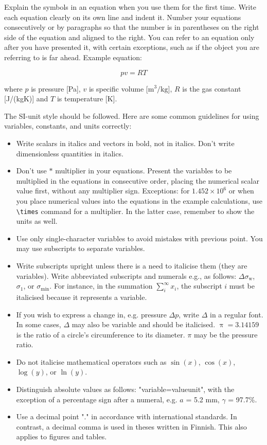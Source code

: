 Explain the symbols in an equation when you use them for the first time. Write each equation clearly on its own line and indent it. Number your equations consecutively or by paragraphs so that the number is in parentheses on the right side of the equation and aligned to the right. You can refer to an equation only after you have presented it, with certain exceptions, such as if the object you are referring to is far ahead. Example equation:

\begin{equation}
    pv=RT
\end{equation}

where $p$ is pressure [Pa], $v$ is specific volume [$\mathrm{m^3/kg}$], $R$ is the gas constant [J/(kgK)] and $T$ is temperature [K].

The SI-unit style should be followed. Here are some common guidelines for using variables, constants, and units correctly:
\begin{itemize}
    \item Write scalars in italics and vectors in bold, not in italics. Don’t write dimensionless quantities in italics.
    \item Don't use $*$ multiplier in your equations. Present the variables to be multiplied in the equations in consecutive order, placing the numerical scalar value first, without any multiplier sign. Exceptions: for $1.452\times10^6$ or when you place numerical values into the equations in the example calculations, use \verb|\times| command for a multiplier. In the latter case, remember to show the units as well.
    \item Use only single-character variables to avoid mistakes with previous point. You may use subscripts to separate variables.
    \item Write subscripts upright unless there is a need to italicise them (they are variables). Write abbreviated subscripts and numerals e.g., as follows: $\Delta\sigma_{\mathrm{w}}$, $\sigma_1$, or $\sigma_\mathrm{min}$. For instance, in the summation $\sum_i^\infty x_i$, the subscript $i$ must be italicised because it represents a variable.
    \item If you wish to express a change in, e.g. pressure $\Delta p$, write $\Delta$ in a regular font. In some cases, $\varDelta$ may also be variable and should be italicised. $\uppi = 3.14159$ is the ratio of a circle’s circumference to its diameter. $\pi$ may be the pressure ratio.
    \item Do not italicise mathematical operators such as $\sin(x)$, $\cos(x)$, $\log(y)$, or $\ln(y)$.
    \item Distinguish absolute values as follows: "variable\textunderscore=\textunderscore value\textunderscore unit", with the exception of a percentage sign after a numeral, e.g. $a$ = 5.2 mm, $\gamma$ = 97.7\%.
    \item Use a decimal point "." in accordance with international standards. In contrast, a decimal comma is used in theses written in Finnish. This also applies to figures and tables.
\end{itemize}

